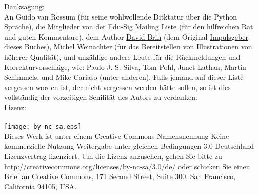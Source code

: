 \noindent
Danksagung:\\
An Guido van Rossum (für seine wohlwollende Ditktatur über die Python Sprache), die Mitglieder von der \href{http://www.python.org/community/sigs/current/edu-sig/}{Edu-Sig} Mailing Liste (für den hilfreichen Rat und guten Kommentare), dem Author \href{http://www.davidbrin.com/}{David Brin} (dem Original \href{http://www.salon.com/tech/feature/2006/09/14/basic/}{Impulsgeber} dieses Buches), Michel Weinachter (für das Bereitstellen von Illustrationen von höherer Qualität), und unzählige andere Leute für die Rückmeldungen und Korrekturvorschläge, wie: Paulo J. S. Silva, Tom Pohl, Janet Lathan, Martin Schimmels, und Mike Cariaso (unter anderen).  Falls jemand auf dieser Liste vergessen worden ist, der nicht vergessen werden hätte sollen, so ist dies vollständig der vorzeitigen Senilität des Autors zu verdanken.\\
\noindent
Lizenz:\\
\\
\texttt{[image: by-nc-sa.eps]}\\
Dieses Werk ist unter einem Creative Commons Namensnennung-Keine kommerzielle Nutzung-Weitergabe unter gleichen Bedingungen 3.0 Deutschland Lizenzvertrag lizenziert. Um die Lizenz anzusehen, gehen Sie bitte zu \\
\href{http://creativecommons.org/licenses/by-nc-sa/3.0/de/}{http://creativecommons.org/licenses/by-nc-sa/3.0/de/} oder schicken Sie einen Brief an Creative Commons, 171 Second Street, Suite 300, San Francisco, California 94105, USA.

